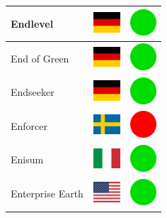 \documentclass[12pt, a4paper, twoside]{report}
\begin{document}
\begin{center}
\begin{longtable}{|p{5cm}|p{2cm}|p{2cm}|}
Endlevel & \includegraphics[width=1cm]{4x3/de} & \includegraphics[width=1cm]{likes/y} \\ \hline
End of Green & \includegraphics[width=1cm]{4x3/de} & \includegraphics[width=1cm]{likes/y} \\ \hline
Endseeker & \includegraphics[width=1cm]{4x3/de} & \includegraphics[width=1cm]{likes/y} \\ \hline
Enforcer & \includegraphics[width=1cm]{4x3/se} & \includegraphics[width=1cm]{likes/n} \\ \hline
Enisum & \includegraphics[width=1cm]{4x3/it} & \includegraphics[width=1cm]{likes/y} \\ \hline
Enterprise Earth & \includegraphics[width=1cm]{4x3/us} & \includegraphics[width=1cm]{likes/y} \\ \hline

\end{longtable}
\end{center}
\end{document}
